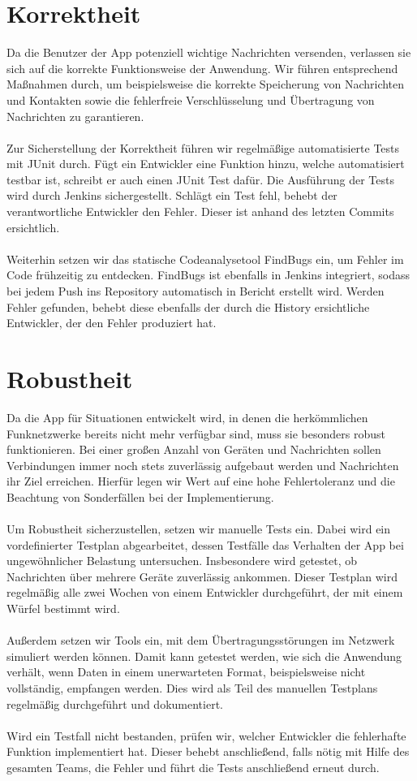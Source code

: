 \documentclass[accentcolor=tud0b,12pt,paper=a4]{tudreport}
\begin{document}
    \section{Korrektheit}
      Da die Benutzer der App potenziell wichtige Nachrichten versenden, verlassen sie sich auf die korrekte Funktionsweise der Anwendung. Wir führen entsprechend Maßnahmen durch, um beispielsweise die korrekte Speicherung von Nachrichten und Kontakten sowie die fehlerfreie Verschlüsselung und Übertragung von Nachrichten zu garantieren.\\\\
      Zur Sicherstellung der Korrektheit führen wir regelmäßige automatisierte Tests mit JUnit durch. Fügt ein Entwickler eine Funktion hinzu, welche automatisiert testbar ist, schreibt er auch einen JUnit Test dafür. Die Ausführung der Tests wird durch Jenkins sichergestellt. Schlägt ein Test fehl, behebt der verantwortliche Entwickler den Fehler. Dieser ist anhand des letzten Commits ersichtlich.\\\\
      Weiterhin setzen wir das statische Codeanalysetool FindBugs ein, um Fehler im Code frühzeitig zu entdecken. FindBugs ist ebenfalls in Jenkins integriert, sodass bei jedem Push ins Repository automatisch in Bericht erstellt wird. Werden Fehler gefunden, behebt diese ebenfalls der durch die History ersichtliche Entwickler, der den Fehler produziert hat.

    \section{Robustheit}
      Da die App für Situationen entwickelt wird, in denen die herkömmlichen Funknetzwerke bereits nicht mehr verfügbar sind, muss sie besonders robust funktionieren. Bei einer großen Anzahl von Geräten und Nachrichten sollen Verbindungen immer noch stets zuverlässig aufgebaut werden und Nachrichten ihr Ziel erreichen. Hierfür legen wir Wert auf eine hohe Fehlertoleranz und die Beachtung von Sonderfällen bei der Implementierung.\\\\
      Um Robustheit sicherzustellen, setzen wir manuelle Tests ein. Dabei wird ein vordefinierter Testplan abgearbeitet, dessen Testfälle das Verhalten der App bei ungewöhnlicher Belastung untersuchen. Insbesondere wird getestet, ob Nachrichten über mehrere Geräte zuverlässig ankommen. Dieser Testplan wird regelmäßig alle zwei Wochen von einem Entwickler durchgeführt, der mit einem Würfel bestimmt wird.\\\\
      Außerdem setzen wir Tools ein, mit dem Übertragungsstörungen im Netzwerk simuliert werden können. Damit kann getestet werden, wie sich die Anwendung verhält, wenn Daten in einem unerwarteten Format, beispielsweise nicht vollständig, empfangen werden. Dies wird als Teil des manuellen Testplans regelmäßig durchgeführt und dokumentiert.\\\\
      Wird ein Testfall nicht bestanden, prüfen wir, welcher Entwickler die fehlerhafte Funktion implementiert hat. Dieser behebt anschließend, falls nötig mit Hilfe des gesamten Teams, die Fehler und führt die Tests anschließend erneut durch.
\end{document}
